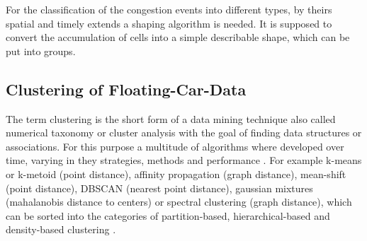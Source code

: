 \documentclass[a4paper,headsepline,footsepline,fontsize=11pt,BCOR=12mm,DIV=12]{report}
\begin{document}
For the classification of the congestion events into different types, by theirs spatial and timely extends a shaping algorithm is needed. It is supposed to convert the accumulation of cells into a simple describable shape, which can be put into groups.

\subsection{Clustering of Floating-Car-Data}
\label{methodology_clustering}
The term clustering is the short form of a data mining technique also called numerical taxonomy or cluster analysis with the goal of finding data structures or associations. For this purpose a multitude of algorithms where developed over time, varying in they strategies, methods and performance \cite{Busch2004}. For example k-means or k-metoid (point distance), affinity propagation (graph distance), mean-shift (point distance), DBSCAN (nearest point distance), gaussian mixtures (mahalanobis distance to centers) or spectral clustering (graph distance), which can be sorted into the categories of partition-based, hierarchical-based and density-based clustering \cite{Chauhan2020,Yildirim2020}.

\end{document}
